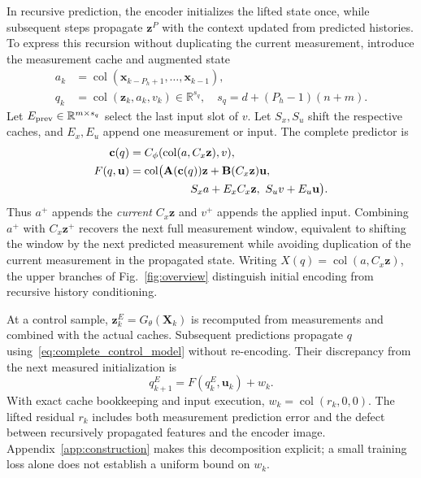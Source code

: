 \documentclass[journal]{IEEEtran}
\newcommand{\vx}{\mathbf{x}}
\newcommand{\vu}{\mathbf{u}}
\newcommand{\vz}{\mathbf{z}}
\newcommand{\vc}{\mathbf{c}}
\newcommand{\mA}{\mathbf{A}}
\newcommand{\mB}{\mathbf{B}}
\newcommand{\mX}{\mathbf{X}}
\newcommand{\R}{\mathbb{R}}
\newcommand{\col}{\operatorname{col}}
\begin{document}
In recursive prediction, the encoder initializes the lifted state once, while subsequent steps propagate $\vz^P$ with the context updated from predicted histories. To express this recursion without duplicating the current measurement, introduce the measurement cache and augmented state
\begin{equation}
\begin{split}
a_k&=\col(\vx_{k-P_h+1},\ldots,\vx_{k-1}),\\
q_k&=\col(\vz_k,a_k,v_k)\in\R^{s_q},\quad
s_q=d+(P_h-1)(n+m).
\end{split}
\label{eq:augmented_state}
\end{equation}
Let $E_{\rm prev}\in\R^{m\times s_q}$ select the last input slot of $v$. Let $S_x,S_u$ shift the respective caches, and $E_x,E_u$ append one measurement or input. The complete predictor is
\begin{equation}
\begin{split}
\vc(q)&=C_\phi(\col(a,C_x\vz),v),\\
F(q,\vu)&=\col\bigl(\mA(\vc(q))\vz+\mB(C_x\vz)\vu,\\
&\hspace{19mm}S_xa+E_xC_x\vz,\ S_uv+E_u\vu\bigr).
\end{split}
\label{eq:complete_control_model}
\end{equation}
Thus $a^+$ appends the \emph{current} $C_x\vz$ and $v^+$ appends the applied input. Combining $a^+$ with $C_x\vz^+$ recovers the next full measurement window, equivalent to shifting the window by the next predicted measurement while avoiding duplication of the current measurement in the propagated state. Writing $X(q)=\col(a,C_x\vz)$, the upper branches of Fig.~\ref{fig:overview} distinguish initial encoding from recursive history conditioning.

At a control sample, $\vz_k^E=G_\theta(\mX_k)$ is recomputed from measurements and combined with the actual caches. Subsequent predictions propagate $q$ using~\eqref{eq:complete_control_model} without re-encoding. Their discrepancy from the next measured initialization is
\begin{equation}
q_{k+1}^E=F(q_k^E,\vu_k)+w_k.
\label{eq:residual_definition}
\end{equation}
With exact cache bookkeeping and input execution, $w_k=\col(r_k,0,0)$. The lifted residual $r_k$ includes both measurement prediction error and the defect between recursively propagated features and the encoder image. Appendix~\ref{app:construction} makes this decomposition explicit; a small training loss alone does not establish a uniform bound on $w_k$.
\end{document}
